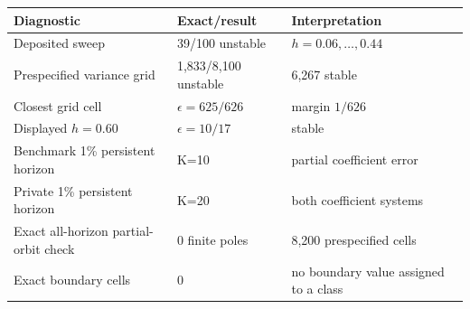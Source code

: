 \begin{tabular}{@{}p{}p{}p{}@{}}
\toprule
Diagnostic & Exact/result & Interpretation \\
\midrule
Deposited sweep & 39/100 unstable & $h=0.06,\ldots,0.44$ \\
Prespecified variance grid & 1,833/8,100 unstable & 6,267 stable \\
Closest grid cell & $\epsilon=625/626$ & margin $1/626$ \\
Displayed $h=0.60$ & $\epsilon=10/17$ & stable \\
Benchmark 1\% persistent horizon & K=10 & partial coefficient error \\
Private 1\% persistent horizon & K=20 & both coefficient systems \\
Exact all-horizon partial-orbit check & 0 finite poles & 8,200 prespecified cells \\
Exact boundary cells & 0 & no boundary value assigned to a class \\
\bottomrule
\end{tabular}
